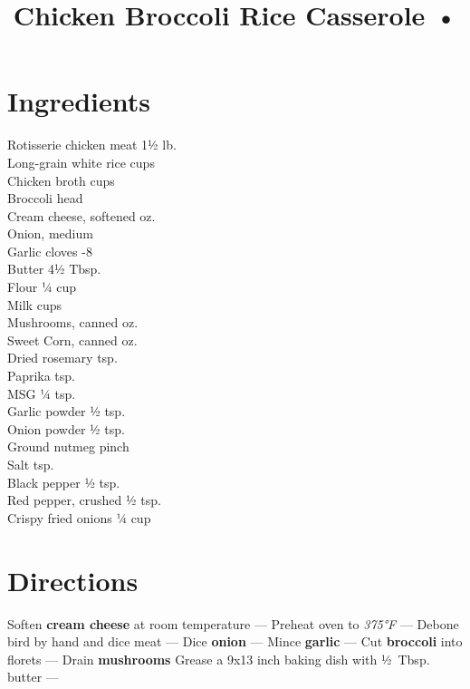 \documentclass[11pt,letterpaper]{article}
\title{Chicken Broccoli Rice Casserole •}
\author{}
\date{}
\begin{document}
\maketitle
\thispagestyle{empty}

\section*{Ingredients}
\setlength{\columnsep}{20pt}
\begin{multicols}{2}
\noindent
    Rotisserie chicken meat \dotfill 1½ lb. \\
    Long-grain white rice  cups \\
    Chicken broth  cups \\
    Broccoli  head \\
    Cream cheese, softened  oz. \\
    Onion, medium  \\
    Garlic cloves -8 \\
    Butter \dotfill 4½ Tbsp. \\
    Flour \dotfill ¼ cup \\
    Milk  cups \\
    \columnbreak
    Mushrooms, canned  oz. \\
    Sweet Corn, canned  oz. \\
    Dried rosemary  tsp. \\
    Paprika  tsp. \\
    MSG \dotfill ¼ tsp. \\
    Garlic powder \dotfill ½ tsp. \\
    Onion powder \dotfill ½ tsp. \\
    Ground nutmeg \dotfill pinch \\
    Salt  tsp. \\
    Black pepper \dotfill ½ tsp. \\
    Red pepper, crushed \dotfill ½ tsp. \\
    Crispy fried onions \dotfill ¼ cup
\end{multicols}

\section*{Directions}

\noindent
Soften \textbf{cream cheese} at room temperature ---
Preheat oven to \textit{375°F} ---
Debone bird by hand and dice meat ---
Dice \textbf{onion} ---
Mince \textbf{garlic} ---
Cut \textbf{broccoli} into florets ---
Drain \textbf{mushrooms}
Grease a 9x13 inch baking dish with ½~Tbsp. butter ---
\end{document}
